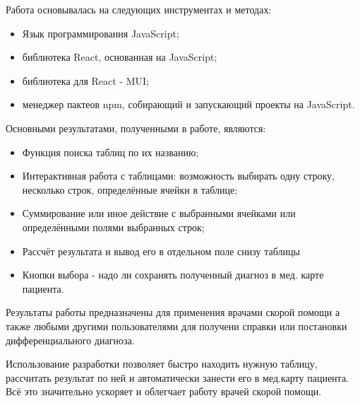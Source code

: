 Работа основывалась на следующих инструментах и методах:
\begin{itemize}
\item Язык программирования JavaScript;
\item библиотека React, основанная на  JavaScript;
\item библиотека для React - MUI;
\item менеджер пактеов npm, собирающий и запускающий проекты на JavaScript.
\end{itemize}

Основными результатами, полученными в работе, являются:
\begin{itemize}
\item Функция поиска таблиц по их названию;
\item Интерактивная работа с таблицами: возможность выбирать одну строку, несколько строк, определённые ячейки в таблице;
\item Суммирование или иное действие с выбранными ячейками или определёнными полями выбранных строк;
\item Рассчёт результата и вывод его в отдельном поле снизу таблицы
\item Кнопки выбора - надо ли сохранять полученный диагноз в мед. карте пациента.
\end{itemize}

Результаты работы предназначены для применения врачами скорой помощи а также любыми другими пользователями для получени справки или постановки дифференциального диагноза. 

Использование разработки позволяет быстро находить нужную таблицу, рассчитать результат по ней и автоматически занести его в мед.карту пациента. Всё это значительно ускоряет и облегчает работу врачей скорой помощи.